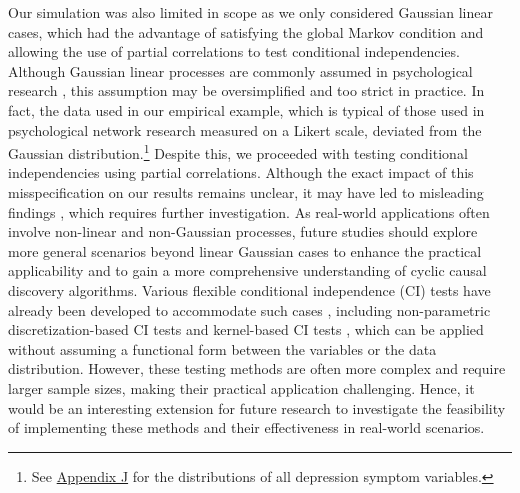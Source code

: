 \documentclass[twoside, 11pt]{article}
\begin{document}
Our simulation was also limited in scope as we only considered Gaussian linear cases, which had the advantage of satisfying the global Markov condition and allowing the use of partial correlations to test conditional independencies. Although Gaussian linear processes are commonly assumed in psychological research \citep{pek_how_2018, beller_differential_2013}, this assumption may be oversimplified and too strict in practice. In fact, the data used in our empirical example, which is typical of those used in psychological network research measured on a Likert scale, deviated from the Gaussian distribution.\footnote{See \hyperref[emp-dist]{Appendix J} for the distributions of all depression symptom variables.} Despite this, we proceeded with testing conditional independencies using partial correlations. Although the exact impact of this misspecification on our results remains unclear, it may have led to misleading findings \citep{baba_partial_2004}, which requires further investigation.
As real-world applications often involve non-linear and non-Gaussian processes, future studies should explore more general scenarios beyond linear Gaussian cases to enhance the practical applicability and to gain a more comprehensive understanding of cyclic causal discovery algorithms.
Various flexible conditional independence (CI) tests have already been developed to accommodate such cases \citep{li_fan2020, canonne_testing_2018}, including non-parametric discretization-based CI tests \citep{huang_testing_2010} and kernel-based CI tests \citep{zhang_kernel-based_2012}, which can be applied without assuming a functional form between the variables or the data distribution. 
However, these testing methods are often more complex and require larger sample sizes, making their practical application challenging. Hence, it would be an interesting extension for future research to investigate the feasibility of implementing these methods and their effectiveness in real-world scenarios.
\end{document}

